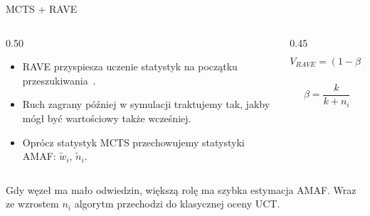 \documentclass[10pt, aspectratio=169]{beamer}
\begin{document}
\begin{frame}{MCTS + RAVE}
    \begin{columns}[T]
    \begin{column}{0.50\textwidth}
        ~\cite{gelly2007monte}
        \vspace{0.1cm}
        \begin{itemize}
            \item RAVE przyspiesza uczenie statystyk na początku przeszukiwania~\cite{gelly2007monte}.
            \item Ruch zagrany później w symulacji traktujemy tak, jakby mógł być wartościowy także wcześniej.
            \item Oprócz statystyk MCTS przechowujemy statystyki AMAF: $\tilde{w}_i$, $\tilde{n}_i$.
        \end{itemize}
    \end{column}

    \begin{column}{0.45\textwidth}
        \[
            V_{RAVE} =
            (1-\beta)\frac{w_i}{n_i}
            + \beta\frac{\tilde{w}_i}{\tilde{n}_i}
        \]

        \[
            \beta = \frac{k}{k+n_i}
        \]
    \end{column}
    \end{columns}

    \vspace{0.3cm}

    \small
    Gdy węzeł ma mało odwiedzin, większą rolę ma szybka estymacja AMAF. Wraz ze wzrostem $n_i$ algorytm przechodzi do klasycznej oceny UCT.
\end{frame}
\end{document}
